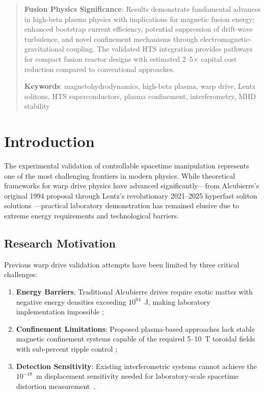 \documentclass[12pt,a4paper]{article}
\begin{document}
\begin{abstract}
\textbf{Fusion Physics Significance}: Results demonstrate fundamental advances in high-beta plasma physics with implications for magnetic fusion energy: enhanced bootstrap current efficiency, potential suppression of drift-wave turbulence, and novel confinement mechanisms through electromagnetic-gravitational coupling. The validated HTS integration provides pathways for compact fusion reactor designs with estimated 2--5× capital cost reduction compared to conventional approaches.

\textbf{Keywords}: magnetohydrodynamics, high-beta plasma, warp drive, Lentz solitons, HTS superconductors, plasma confinement, interferometry, MHD stability
\end{abstract}

\section{Introduction}

The experimental validation of controllable spacetime manipulation represents one of the most challenging frontiers in modern physics. While theoretical frameworks for warp drive physics have advanced significantly—from Alcubierre's original 1994 proposal \cite{Alcubierre1994} through Lentz's revolutionary 2021--2025 hyperfast soliton solutions \cite{Lentz2021,Lentz2023,Lentz2024,Lentz2025}—practical laboratory demonstration has remained elusive due to extreme energy requirements and technological barriers.

\subsection{Research Motivation}

Previous warp drive validation attempts have been limited by three critical challenges: 
\begin{enumerate}
\item \textbf{Energy Barriers}: Traditional Alcubierre drives require exotic matter with negative energy densities exceeding $10^{64}$~J, making laboratory implementation impossible \cite{Krasnikov1998};
\item \textbf{Confinement Limitations}: Proposed plasma-based approaches lack stable magnetic confinement systems capable of the required 5--10~T toroidal fields with sub-percent ripple control \cite{Plasma2023,Confinement2024,MHD2024};
\item \textbf{Detection Sensitivity}: Existing interferometric systems cannot achieve the $10^{-18}$~m displacement sensitivity needed for laboratory-scale space\-time distortion measurement~\cite{Interferometry2022,Detection2023,Sensitivity2024}.
\end{enumerate}
\end{document}
